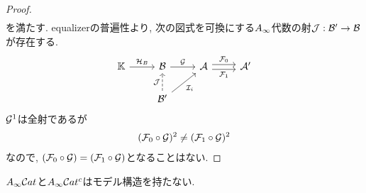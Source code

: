 \documentclass[uplatex, a4paper, 14Q, dvipdfmx]{jsarticle}
\begin{document}
\begin{proof}
\begin{align*}
  \end{align*}
  を満たす. 
  equalizerの普遍性より, 次の図式を可換にする$A_{\infty}$代数の射$\mathcal{J} : \mathcal{B}' \to \mathcal{B}$が存在する.
  \[\begin{tikzcd}
    \bbK & \B & \A & {\A'} \\
    & {\B'}
    \arrow["\G", from=1-2, to=1-3]
    \arrow["{\F_1}"', shift right=1, from=1-3, to=1-4]
    \arrow["{\F_0}", shift left=1, from=1-3, to=1-4]
    \arrow["{\H_B}", from=1-1, to=1-2]
    \arrow["{\I_i}"', from=2-2, to=1-3]
    \arrow["\J", dashed, from=2-2, to=1-2]
  \end{tikzcd}\]
  $\mathcal{G}^1$は全射であるが
  \begin{align*}
    (\mathcal{F}_0 \circ \mathcal{G})^2 \neq (\mathcal{F}_1 \circ \mathcal{G})^2 
  \end{align*}
  なので, $(\mathcal{F}_0 \circ \mathcal{G}) = (\mathcal{F}_1 \circ \mathcal{G})$となることはない. 
\end{proof}

\begin{theorem}
  $A_{\infty}\mathcal{C} at$と$A_{\infty}\mathcal{C} at^c$はモデル構造を持たない. 
\end{theorem}
\end{document}
